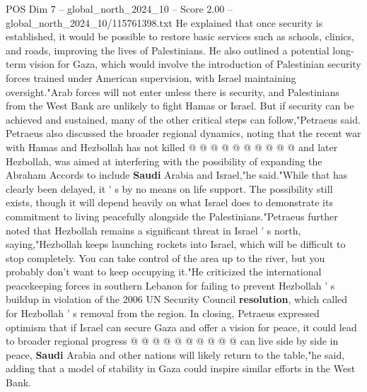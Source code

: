 \begin{textsample}{POS Dim 7 – global\_north\_2024\_10 – Score 2.00 – global\_north\_2024\_10/115761398.txt}
He explained that once security is established, it would be possible to restore basic services such as schools, clinics, and roads, improving the lives of Palestinians.
He also outlined a potential long-term vision for Gaza, which would involve the introduction of Palestinian security forces trained under American supervision, with Israel maintaining oversight."Arab forces will not enter unless there is security, and Palestinians from the West Bank are unlikely to fight Hamas or Israel.
But if security can be achieved and sustained, many of the other critical steps can follow,"Petraeus said.
Petraeus also discussed the broader regional dynamics, noting that the recent war with Hamas and Hezbollah has not killed @ @ @ @ @ @ @ @ @ @ and later Hezbollah, was aimed at interfering with the possibility of expanding the Abraham Accords to include \textbf{Saudi} Arabia and Israel,"he said."While that has clearly been delayed, it ' s by no means on life support.
The possibility still exists, though it will depend heavily on what Israel does to demonstrate its commitment to living peacefully alongside the Palestinians."Petraeus further noted that Hezbollah remains a significant threat in Israel ' s north, saying,"Hezbollah keeps launching rockets into Israel, which will be difficult to stop completely.
You can take control of the area up to the river, but you probably don't want to keep occupying it."He criticized the international peacekeeping forces in southern Lebanon for failing to prevent Hezbollah ' s buildup in violation of the 2006 UN Security Council \textbf{resolution}, which called for Hezbollah ' s removal from the region.
In closing, Petraeus expressed optimism that if Israel can secure Gaza and offer a vision for peace, it could lead to broader regional progress @ @ @ @ @ @ @ @ @ @ can live side by side in peace, \textbf{Saudi} Arabia and other nations will likely return to the table,"he said, adding that a model of stability in Gaza could inspire similar efforts in the West Bank.

\end{textsample}

